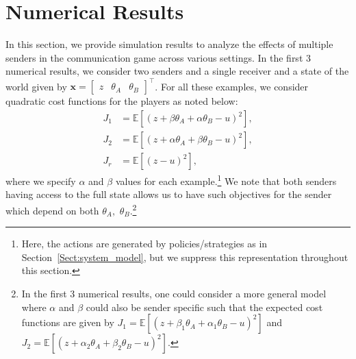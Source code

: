 \documentclass[12pt,journal,onecolumn]{IEEEtran}
\begin{document}

\section{Numerical Results}\label{Sect:Num_result}
In this section, we provide simulation results to analyze the effects of multiple senders in the communication game across various settings. In the first 3 numerical results, we consider two senders and a single receiver and a state of the world given by $\boldsymbol{x}=\begin{bmatrix}z &\theta_A &\theta_B\end{bmatrix}^\top$. For all these examples, we consider quadratic cost functions for the players as noted below:
\begin{align}
 J_{1} &=\mathbb{E}[(z+\beta \theta_A+\alpha\theta_B-u)^2], \\
 J_{2} &=\mathbb{E}[(z+\alpha\theta_A+\beta\theta_B-u)^2], \\
 J_{r} &=\mathbb{E}[(z-u)^2],
\end{align}
where we specify $\alpha$ and $\beta$ values for each example.\footnote{Here, the actions are generated by policies/strategies as in Section~\ref{Sect:system_model}, but we suppress this representation throughout this section.} We note that both senders having access to the full state allows us to have such objectives for the sender which depend on both $\theta_A,$ $\theta_B$.\footnote{In the first 3 numerical results, one could consider a more general model where $\alpha$ and $\beta$ could also be sender specific such that the expected cost functions are given by $J_{1} =\mathbb{E}[(z+\beta_1 \theta_A+\alpha_1\theta_B-u)^2]$ and $J_{2} =\mathbb{E}[(z+\alpha_2\theta_A+\beta_2\theta_B-u)^2]$.}
\end{document}
